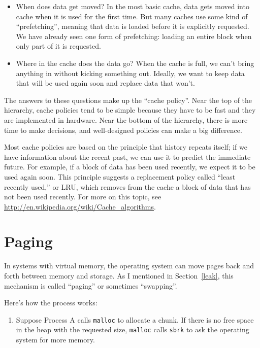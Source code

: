 \documentclass[12pt]{book}
\begin{document}
{\begin{itemize}
\item When does data get moved?  In the most basic cache, data gets
  moved into cache when it is used for the first time.  But many
  caches use some kind of ``prefetching'', meaning that data is
  loaded before it is explicitly requested.  We have already seen
  one form of prefetching: loading an entire block when only part of
  it is requested.

\item Where in the cache does the data go?  When the cache is full, we
  can't bring anything in without kicking something out.  Ideally,
  we want to keep data that will be used again soon and replace data
  that won't.

\end{itemize}

The answers to these questions make up the ``cache policy''.
Near the top of the hierarchy, cache policies tend to be simple
because they have to be fast and they are implemented in hardware.
Near the bottom of the hierarchy, there is more time to make decisions,
and well-designed policies can make a big difference.

Most cache policies are based on the principle that history repeats
itself; if we have information about the recent past, we can use it to
predict the immediate future.  For example, if a block of data has
been used recently, we expect it to be used again soon.  This
principle suggests a replacement policy called ``least recently
used,'' or LRU, which removes from the cache a block of data that
has not been used recently.  For more on this topic, see
\url{http://en.wikipedia.org/wiki/Cache_algorithms}.


\section{Paging}
\label{paging}

In systems with virtual memory, the operating system can move
pages back and forth between memory and storage.  As I mentioned
in Section~\ref{leak}, this mechanism is called ``paging'' or
sometimes ``swapping''.

Here's how the process works:

\begin{enumerate}

\item Suppose Process A calls {\tt malloc} to allocate a chunk.  If there
is no free space in the heap with the requested size, {\tt malloc} calls
{\tt sbrk} to ask the operating system for more memory.


\end{enumerate}}
\end{document}
